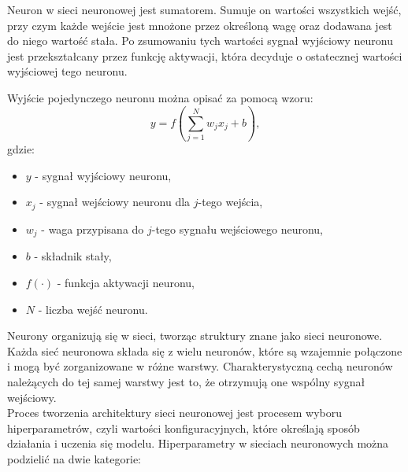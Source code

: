\documentclass[a4paper,twoside,12pt]{book}
\begin{document}
Neuron w sieci neuronowej jest sumatorem. Sumuje on wartości wszystkich wejść, przy czym każde wejście jest mnożone przez określoną wagę oraz dodawana jest do niego wartość stała. Po zsumowaniu tych wartości sygnał wyjściowy neuronu jest przekształcany przez funkcję aktywacji, która decyduje o ostatecznej wartości wyjściowej tego neuronu.\cite{bib:ksiazka_sieci}

Wyjście pojedynczego neuronu można opisać za pomocą wzoru:
\begin{equation}
  y = f\left(\sum_{j=1}^{N} w_j x_j + b\right),
\end{equation}
gdzie:
\begin{itemize}
  \item \( y \) - sygnał wyjściowy neuronu,
  \item \( x_j \) - sygnał wejściowy neuronu dla \( j \)-tego wejścia,
  \item \( w_j \) - waga przypisana do \( j \)-tego sygnału wejściowego neuronu,
  \item \( b \) - składnik stały,
  \item \( f(\cdot) \) - funkcja aktywacji neuronu,
  \item \( N \) - liczba wejść neuronu.
\end{itemize}

Neurony organizują się w sieci, tworząc struktury znane jako sieci neuronowe. Każda sieć neuronowa składa się z wielu neuronów, które są wzajemnie połączone i mogą być zorganizowane w różne warstwy. Charakterystyczną cechą neuronów należących do tej samej warstwy jest to, że otrzymują one wspólny sygnał wejściowy.\\

Proces tworzenia architektury sieci neuronowej jest procesem wyboru hiperparametrów, czyli wartości konfiguracyjnych, które określają sposób działania i uczenia się modelu. Hiperparametry w sieciach neuronowych można podzielić na dwie kategorie:
\end{document}
